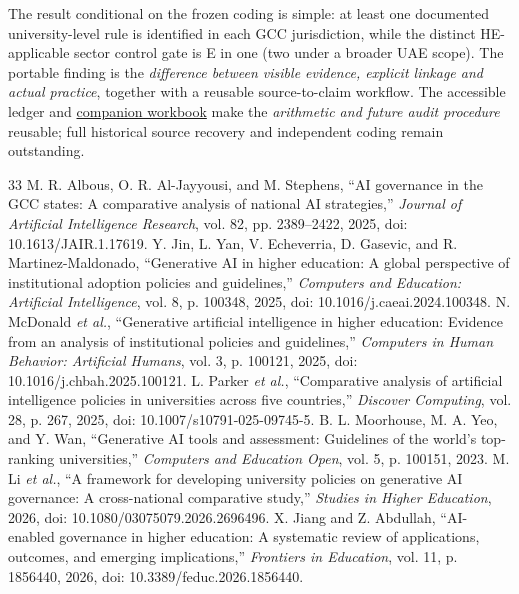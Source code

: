 \documentclass[conference,letterpaper]{IEEEtran}
\begin{document}
The result conditional on the frozen coding is simple: at least one documented university-level rule is identified in each GCC jurisdiction, while the distinct HE-applicable sector control gate is E in one (two under a broader UAE scope). The portable finding is the \emph{difference between visible evidence, explicit linkage and actual practice}, together with a reusable source-to-claim workflow. The accessible ledger and \href{https://github.com/shaikhamalkawi-ux/From-AI-Strategy-to-University-Rules-in-the-GCC/blob/main/ICAMAC2026_Paper90_R5_57/resources/ICAMAC_Paper90_R5_Reusable_Audit_Workbook.xlsx}{companion workbook} make the \emph{arithmetic and future audit procedure} reusable; full historical source recovery and independent coding remain outstanding.

\begin{thebibliography}{33}\footnotesize
{} M. R. Albous, O. R. Al-Jayyousi, and M. Stephens, ``AI governance in the GCC states: A comparative analysis of national AI strategies,'' \emph{Journal of Artificial Intelligence Research}, vol. 82, pp. 2389--2422, 2025, doi: 10.1613/JAIR.1.17619.
 Y. Jin, L. Yan, V. Echeverria, D. Gasevic, and R. Martinez-Maldonado, ``Generative AI in higher education: A global perspective of institutional adoption policies and guidelines,'' \emph{Computers and Education: Artificial Intelligence}, vol. 8, p. 100348, 2025, doi: 10.1016/j.caeai.2024.100348.
 N. McDonald \emph{et al.}, ``Generative artificial intelligence in higher education: Evidence from an analysis of institutional policies and guidelines,'' \emph{Computers in Human Behavior: Artificial Humans}, vol. 3, p. 100121, 2025, doi: 10.1016/j.chbah.2025.100121.
 L. Parker \emph{et al.}, ``Comparative analysis of artificial intelligence policies in universities across five countries,'' \emph{Discover Computing}, vol. 28, p. 267, 2025, doi: 10.1007/s10791-025-09745-5.
 B. L. Moorhouse, M. A. Yeo, and Y. Wan, ``Generative AI tools and assessment: Guidelines of the world's top-ranking universities,'' \emph{Computers and Education Open}, vol. 5, p. 100151, 2023.
 M. Li \emph{et al.}, ``A framework for developing university policies on generative AI governance: A cross-national comparative study,'' \emph{Studies in Higher Education}, 2026, doi: 10.1080/03075079.2026.2696496.
 X. Jiang and Z. Abdullah, ``AI-enabled governance in higher education: A systematic review of applications, outcomes, and emerging implications,'' \emph{Frontiers in Education}, vol. 11, p. 1856440, 2026, doi: 10.3389/feduc.2026.1856440.

\end{thebibliography}
\end{document}
